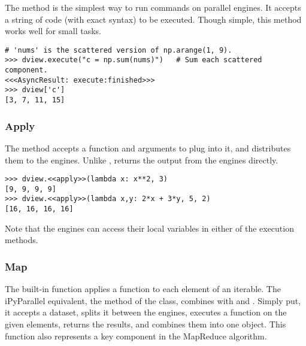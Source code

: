 The  method is the simplest way to run commands on parallel engines.
It accepts a string of code (with exact syntax) to be executed.
Though simple, this method works well for small tasks.

\begin{lstlisting}
# 'nums' is the scattered version of np.arange(1, 9).
>>> dview.execute("c = np.sum(nums)")   # Sum each scattered component.
<<<AsyncResult: execute:finished>>>
>>> dview['c']
[3, 7, 11, 15]
\end{lstlisting}

\subsubsection*{Apply} %

The  method accepts a function and arguments to plug into it, and distributes them to the engines.
Unlike ,  returns the output from the engines directly.

\begin{lstlisting}
>>> dview.<<apply>>(lambda x: x**2, 3)
[9, 9, 9, 9]
>>> dview.<<apply>>(lambda x,y: 2*x + 3*y, 5, 2)
[16, 16, 16, 16]
\end{lstlisting}

Note that the engines can access their local variables in either of the execution methods.

\subsubsection*{Map} %

The built-in  function applies a function to each element of an iterable.
The iPyParallel equivalent, the  method of the  class, combines  with  and .
Simply put, it accepts a dataset, splits it between the engines, executes a function on the given elements, returns the results, and combines them into one object.
This function also represents a key component in the MapReduce algorithm.


